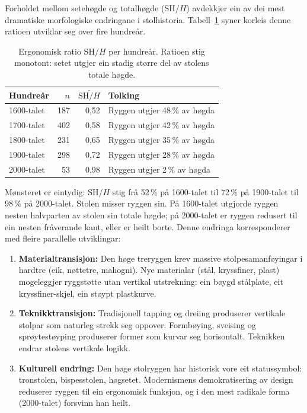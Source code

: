 \documentclass[10pt, a4paper, twocolumn]{article}
\begin{document}
Forholdet mellom setehøgde og totalhøgde ($\text{SH}/H$) avdekkjer ein av dei mest dramatiske morfologiske endringane i stolhistoria. Tabell~\ref{tab:sh_ratio} syner korleis denne ratioen utviklar seg over fire hundreår.

\begin{table}[H]
\centering
\caption{Ergonomisk ratio $\text{SH}/H$ per hundreår. Ratioen stig monotont: setet utgjer ein stadig større del av stolens totale høgde.}
\label{tab:sh_ratio}
\begin{tabular}{@{}lrrl@{}}
\toprule
\textbf{Hundreår} & \textbf{$n$} & \textbf{$\overline{\text{SH}/H}$} & \textbf{Tolking} \\
\midrule
1600-talet & 187 & 0,52 & Ryggen utgjer 48\,\% av høgda \\
1700-talet & 402 & 0,58 & Ryggen utgjer 42\,\% av høgda \\
1800-talet & 231 & 0,65 & Ryggen utgjer 35\,\% av høgda \\
1900-talet & 298 & 0,72 & Ryggen utgjer 28\,\% av høgda \\
2000-talet & 53 & 0,98 & Ryggen utgjer 2\,\% av høgda \\
\bottomrule
\end{tabular}
\end{table}

Mønsteret er eintydig: $\text{SH}/H$ stig frå 52\,\% på 1600-talet til 72\,\% på 1900-talet til 98\,\% på 2000-talet. Stolen misser ryggen sin. På 1600-talet utgjorde ryggen nesten halvparten av stolen sin totale høgde; på 2000-talet er ryggen redusert til ein nesten fråverande kant, eller er heilt borte. Denne endringa korresponderer med fleire parallelle utviklingar:

\begin{enumerate}
  \item \textbf{Materialtransisjon:} Den høge treryggen krev massive stolpesamanføyingar i hardtre (eik, nøttetre, mahogni). Nye materialar (stål, kryssfiner, plast) mogeleggjer ryggstøtte utan vertikal utstrekning: ein bøygd stålplate, eit kryssfiner-skjel, ein støypt plastkurve.

  \item \textbf{Teknikktransisjon:} Tradisjonell tapping og dreiing produserer vertikale stolpar som naturleg strekk seg oppover. Formbøying, sveising og sprøytestøyping produserer former som kurvar seg horisontalt. Teknikken endrar stolens vertikale logikk.

  \item \textbf{Kulturell endring:} Den høge stolryggen har historisk vore eit statussymbol: tronstolen, bispesstolen, høgsetet. Modernismens demokratisering av design reduserer ryggen til ein ergonomisk funksjon, og i den mest radikale forma (2000-talet) forsvinn han heilt.
\end{enumerate}
\end{document}
